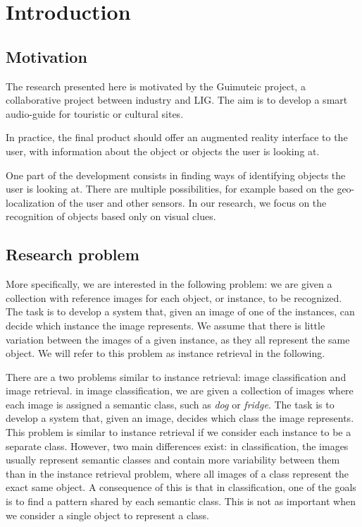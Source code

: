 
\chapter{Introduction}
\section{Motivation}
The research presented here is motivated by the Guimuteic project,
a collaborative project between industry and LIG. The
aim is to develop a smart audio-guide for touristic or cultural sites.

In practice, the final product should offer an augmented reality
interface to the user, with information about the object or objects
the user is looking at.

One part of the development consists in finding ways of identifying
objects the user is looking at. There are multiple possibilities,
for example based on the geo-localization of the user and other sensors.
In our research, we focus on the recognition of objects based
only on visual clues.

\section{Research problem}
More specifically, we are interested in the following problem:
we are given a collection with reference images for each object,
or instance, to be recognized. The task is to develop a system that,
given an image of one of the instances, can decide which instance
the image represents. We assume that there is little variation between
the images of a given instance, as they all represent the same object.
We will refer to this problem as instance retrieval in the following.

There are a two problems similar to instance retrieval: image classification
and image retrieval.
in image classification, we are given a collection of images
where each image is assigned a semantic class,
such as \emph{dog} or \emph{fridge}.
The task is to develop a system that, given an image, decides which
class the image represents.
This problem is similar to instance retrieval if we
consider each instance to be a separate class.
However, two main differences exist: in classification, the images
usually represent semantic classes and contain more variability between them
than in the instance retrieval problem, where all images of a class
represent the exact same object.
A consequence of this is that in classification, one of the goals is to find a pattern shared
by each semantic class. This is not as important when we consider a single
object to represent a class.

